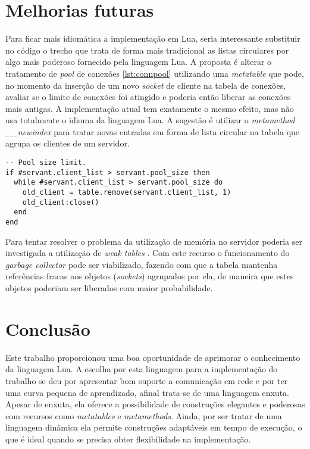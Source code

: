 \documentclass[11pt]{article}
\begin{document}
\section{Melhorias futuras}\label{sec:future}

Para ficar mais idiomática a implementação em Lua, seria interessante substituir
no código o trecho que trata de forma mais tradicional as listas circulares por
algo mais poderoso fornecido pela linguagem Lua. A proposta é alterar o
tratamento de \textit{pool} de conexões \ref{lst:connpool} utilizando uma
\textit{metatable} \cite{metat} que pode, no momento da inserção de um novo
\textit{socket} de cliente na tabela de conexões, avaliar se o limite de
conexões foi atingido e poderia então liberar as conexões mais antigas. A
implementação atual tem exatamente o mesmo efeito, mas não usa totalmente o
idioma da linguagem Lua. A sugestão é utilizar o \textit{metamethod
\_\_newindex} para tratar novas entradas em forma de lista circular na tabela
que agrupa os clientes de um servidor.

\begin{lstlisting}[caption={Pool de conexões},label={lst:connpool}]
-- Pool size limit.
if #servant.client_list > servant.pool_size then
  while #servant.client_list > servant.pool_size do
    old_client = table.remove(servant.client_list, 1)
    old_client:close()
  end
end
\end{lstlisting}

Para tentar resolver o problema da utilização de memória no servidor poderia ser
investigada a utilização de \textit{weak tables} \cite{weakt}. Com este recurso
o funcionamento do \textit{garbage collector} pode ser viabilizado, fazendo com
que a tabela mantenha referências fracas aos objetos (\textit{sockets})
agrupados por ela, de maneira que estes objetos poderiam ser liberados com maior
probabilidade.

\section{Conclusão}\label{sec:conclusion}

Este trabalho proporcionou uma boa oportunidade de aprimorar o conhecimento da
linguagem Lua. A escolha por esta linguagem para a implementação do trabalho se
deu por apresentar bom suporte a comunicação em rede e por ter uma curva pequena
de aprendizado, afinal trata-se de uma linguagem enxuta. Apesar de enxuta, ela
oferece a possibilidade de construções elegantes e poderosas com recursos como
\textit{metatables} e \textit{metamethods}. Ainda, por ser tratar de uma
linguagem dinâmica ela permite construções adaptáveis em tempo de execução, o
que é ideal quando se precisa obter flexibilidade na implementação.



\end{document}
